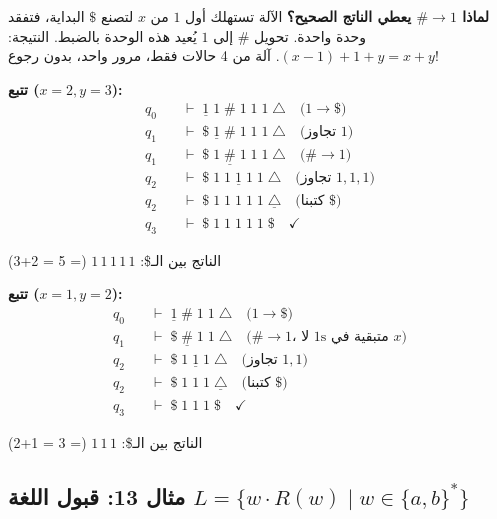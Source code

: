 \documentclass[14pt]{extarticle}
\begin{document}
\begin{boxNote}
\textbf{لماذا $\# \to 1$ يعطي الناتج الصحيح؟} الآلة تستهلك أول $1$ من $x$ لتصنع $\$$ البداية، فتفقد وحدة واحدة. تحويل $\#$ إلى $1$ يُعيد هذه الوحدة بالضبط. النتيجة: $(x-1) + 1 + y = x+y$. آلة من 4 حالات فقط، مرور واحد، بدون رجوع!
\end{boxNote}

\textbf{تتبع ($x=2, y=3$):}
\begin{align*}
q_0 \quad &\vdash \; \underline{1} \; 1 \; \# \; 1 \; 1 \; 1 \; \triangle
    \quad \text{($1 \to \$$)} \\
q_1 \quad &\vdash \; \$ \; \underline{1} \; \# \; 1 \; 1 \; 1 \; \triangle
    \quad \text{(تجاوز $1$)} \\
q_1 \quad &\vdash \; \$ \; 1 \; \underline{\#} \; 1 \; 1 \; 1 \; \triangle
    \quad \text{($\# \to 1$)} \\
q_2 \quad &\vdash \; \$ \; 1 \; 1 \; \underline{1} \; 1 \; 1 \; \triangle
    \quad \text{(تجاوز $1,1,1$)} \\
q_2 \quad &\vdash \; \$ \; 1 \; 1 \; 1 \; 1 \; 1 \; \underline{\triangle}
    \quad \text{(كتبنا $\$$)} \\
q_3 \quad &\vdash \; \$ \; 1 \; 1 \; 1 \; 1 \; 1 \; \$ \quad \checkmark
\end{align*}

الناتج بين الـ\$: $1\,1\,1\,1\,1$ (= 5 = 2+3) \checkmark

\textbf{تتبع ($x=1, y=2$):}
\begin{align*}
q_0 \quad &\vdash \; \underline{1} \; \# \; 1 \; 1 \; \triangle
    \quad \text{($1 \to \$$)} \\
q_1 \quad &\vdash \; \$ \; \underline{\#} \; 1 \; 1 \; \triangle
    \quad \text{($\# \to 1$، لا $1$s متبقية في $x$)} \\
q_2 \quad &\vdash \; \$ \; 1 \; \underline{1} \; 1 \; \triangle
    \quad \text{(تجاوز $1,1$)} \\
q_2 \quad &\vdash \; \$ \; 1 \; 1 \; 1 \; \underline{\triangle}
    \quad \text{(كتبنا $\$$)} \\
q_3 \quad &\vdash \; \$ \; 1 \; 1 \; 1 \; \$ \quad \checkmark
\end{align*}

الناتج بين الـ\$: $1\,1\,1$ (= 3 = 1+2) \checkmark

\clearpage


\subsection{مثال 13: قبول اللغة $L = \{w \cdot R(w) \mid w \in \{a,b\}^*\}$}
\end{document}
